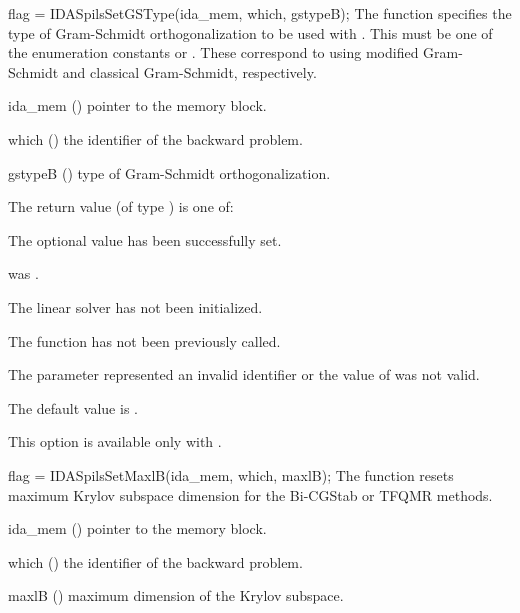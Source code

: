 {
  flag = IDASpilsSetGSType(ida\_mem, which, gstypeB);
}
{
  The function  specifies the type of
  Gram-Schmidt orthogonalization to be used with {\idaspgmr}.
  This must be one of the enumeration constants 
  or . These correspond to using modified Gram-Schmidt 
  and classical Gram-Schmidt, respectively. 
}
{
  \begin{args}[gstypeB]
  \item[ida\_mem] ()
    pointer to the {\idas} memory block.
  \item[which] ()
    the identifier of the backward problem.
  \item[gstypeB] ()
    type of Gram-Schmidt orthogonalization.
  \end{args}
}
{
  The return value  (of type ) is one of:
  \begin{args}
  \item[\Id{IDASPILS\_SUCCESS}] 
    The optional value has been successfully set.
  \item[\Id{IDASPILS\_MEM\_NULL}]
     was .
  \item[\Id{IDASPILS\_LMEM\_NULL}]
    The {\idaspils} linear solver has not been initialized.
  \item[\Id{IDASPILS\_NO\_ADJ}]
    The function  has not been previously called.
  \item[\Id{IDASPILS\_ILL\_INPUT}]
    The parameter  represented an invalid identifier or the 
    value of  was not valid.
  \end{args}
}
{
  The default value is .

  {\warn}This option is available only with {\idaspgmr}.
}
{
  flag = IDASpilsSetMaxlB(ida\_mem, which, maxlB);
}
{
  The function  resets maximum Krylov subspace
  dimension for the Bi-CGStab or TFQMR 
  methods.
}
{
  \begin{args}
  \item[ida\_mem] ()
    pointer to the {\idas} memory block.
  \item[which] ()
    the identifier of the backward problem.
  \item[maxlB] ()
    maximum dimension of the Krylov subspace.
  \end{args}
}
